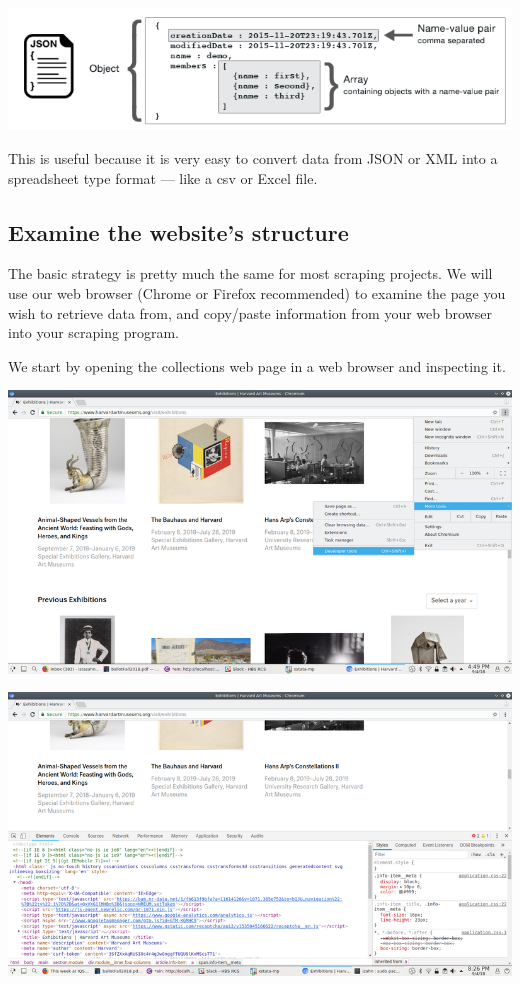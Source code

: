 \documentclass[
]{book}
\begin{document}
\includegraphics{Python/PythonWebScrape/images/json-format.png}

This is useful because it is very easy to convert data from JSON or XML
into a spreadsheet type format --- like a csv or Excel file.

\hypertarget{examine-the-websites-structure}{%
\subsection{Examine the website's structure}\label{examine-the-websites-structure}}

The basic strategy is pretty much the same for most scraping projects.
We will use our web browser (Chrome or Firefox recommended) to examine
the page you wish to retrieve data from, and copy/paste information
from your web browser into your scraping program.

We start by opening the collections web page in a web browser and
inspecting it.

\includegraphics{Python/PythonWebScrape/images/dev_tools.png}

\includegraphics{Python/PythonWebScrape/images/dev_tools_pane.png}
\end{document}

